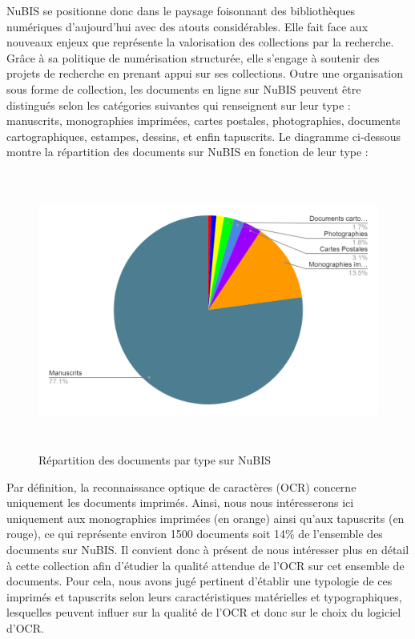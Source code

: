 \documentclass[a4paper,12pt,twoside]{book}
\begin{document}
NuBIS se positionne donc dans le paysage foisonnant des bibliothèques numériques d'aujourd'hui avec des atouts considérables. Elle fait face aux nouveaux enjeux que représente la valorisation des collections par la recherche. Grâce à sa politique de numérisation structurée, elle s'engage à soutenir des projets de recherche en prenant appui sur ses collections. Outre une organisation sous forme de collection, les documents en ligne sur NuBIS peuvent être distingués selon  les catégories
suivantes qui renseignent sur leur type : manuscrits, monographies imprimées, cartes postales,
photographies, documents cartographiques, estampes, dessins, et enfin
tapuscrits. Le diagramme ci-dessous montre la répartition des documents
sur NuBIS en fonction de leur type : \\

\begin{figure} [H]
	\includegraphics[width=5.83194in,height=3.60972in]{vertopal_157ae480aa4a4b07be198b586a812241/media/image2.png}
	\caption{Répartition des documents par type sur NuBIS}
\end{figure}

Par définition, la reconnaissance optique de caractères (OCR) concerne
uniquement les documents imprimés. Ainsi, nous nous intéresserons ici
uniquement aux monographies imprimées (en orange) ainsi qu'aux
tapuscrits (en rouge), ce qui représente environ 1500 documents soit
14\% de l'ensemble des documents sur NuBIS. Il convient donc à présent
de nous intéresser plus en détail à cette collection afin d'étudier la
qualité attendue de l'OCR sur cet ensemble de documents. Pour cela, nous
avons jugé pertinent d'établir une typologie de ces imprimés et
tapuscrits selon leurs caractéristiques matérielles et typographiques,
lesquelles peuvent influer sur la qualité de l'OCR et donc sur le choix
du logiciel d'OCR. 
\end{document}
